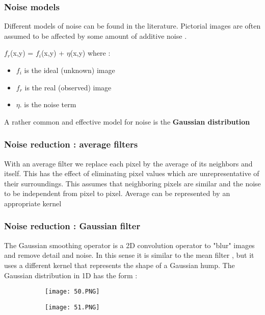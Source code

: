 \documentclass{article}
\begin{document}
\subsubsection{Noise models}

Different models of noise can be found in the literature.
Pictorial images are often assumed to be affected by some amount of additive noise .

$f_r$(x,y) = $f_i$(x,y) + $\eta$(x,y)
where :
\begin{itemize}
    \item $f_i$ is the ideal (unknown) image
    \item $f_r$ is the real (observed) image
    \item $\eta.$ is the noise term
\end{itemize}

A rather common and effective model for noise is the \textbf{Gaussian distribution}

\subsubsection{Noise reduction : average filters}

With an average filter we replace each pixel by the average of its neighbors  and itself.
This has the effect of eliminating pixel values which are unrepresentative of their surroundings.
This assumes that neighboring pixels are similar and the noise to be independent from pixel to pixel.
Average can be represented by an appropriate kernel

\vspace{50cm}

\subsubsection{Noise reduction : Gaussian filter}

The Gaussian smoothing operator is a 2D convolution operator to "blur" images and remove detail and noise.
In this sense it is similar to the mean filter , but it uses a different kernel that represents the shape of a Gaussian hump.
The Gaussian distribution in 1D has the form : 

\begin{figure}[ht!]
  \centering
  \begin{subfigure}[b]{0.3\linewidth}
    \texttt{[image: 50.PNG]}
  \end{subfigure}
     \begin{subfigure}[b]{0.69\textwidth}
         \centering
         \texttt{[image: 51.PNG]}
     \end{subfigure}
\end{figure}
\end{document}
